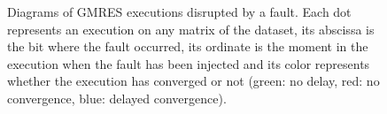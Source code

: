 \begin{figure}[ht]
\caption{Diagrams of GMRES executions disrupted by a fault. Each dot represents an execution on any matrix of the dataset, its abscissa is the bit where the fault occurred, its ordinate is the moment in the execution when the fault has been injected and its color represents whether the execution has converged or not (green: no delay, red: no convergence, blue: delayed convergence).}
\label{fig:matrices_bit_iteration}
\end{figure}








\newpage

 
